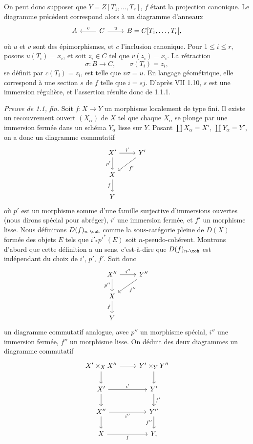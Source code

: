 \documentclass[11pt]{article}
\begin{document}
On peut donc supposer que \(Y=Z[T_1,\ldots,T_r]\), \(f\) étant la projection canonique. Le diagramme précédent correspond alors à un diagramme d'anneaux
\[
\begin{tikzcd}
A & C \arrow[l,"v"'] \arrow[r,"u"] & B=C[T_1,\ldots,T_r],
\end{tikzcd}
\]
où \(u\) et \(v\) sont des épimorphismes, et \(c\) l'inclusion canonique. Pour \(1\leq i\leq r\), posons \(u(T_i)=x_i\), et soit \(z_i\in C\) tel que \(v(z_i)=x_i\). La rétraction
\[
  \sigma:B\longrightarrow C,\qquad \sigma(T_i)=z_i,
\]
se définit par \(c(T_i)=z_i\), est telle que \(v\sigma=u\). En langage géométrique, elle correspond à une section \(s\) de \(f\) telle que \(i=sj\). D'après VII 1.10, \(s\) est une immersion régulière, et l'assertion résulte donc de 1.1.1.

\emph{Preuve de 1.1, fin.} Soit \(f:X\to Y\) un morphisme localement de type fini. Il existe un recouvrement ouvert \((X_\alpha)\) de \(X\) tel que chaque \(X_\alpha\) se plonge par une immersion fermée dans un schéma \(Y_\alpha\) lisse sur \(Y\). Posant \(\coprod X_\alpha=X'\), \(\coprod Y_\alpha=Y'\), on a donc un diagramme commutatif
\[
\begin{tikzcd}
X' \arrow[r,"i'"] \arrow[d,"p'"'] & Y' \arrow[dl,"f'"]\\
X \arrow[d,"f"']\\
Y
\end{tikzcd}
\]
où \(p'\) est un morphisme somme d'une famille surjective d'immersions ouvertes (nous dirons spécial pour abréger), \(i'\) une immersion fermée, et \(f'\) un morphisme lisse. Nous définirons \(D(f)_{n\text{-}\coh}\) comme la sous-catégorie pleine de \(D(X)\) formée des objets \(E\) tels que \(i'_*p'^*(E)\) soit \(n\)-pseudo-cohérent. Montrons d'abord que cette définition a un sens, c'est-à-dire que \(D(f)_{n\text{-}\coh}\) est indépendant du choix de \(i'\), \(p'\), \(f'\). Soit donc
\[
\begin{tikzcd}
X'' \arrow[r,"i''"] \arrow[d,"p''"'] & Y'' \arrow[dl,"f''"]\\
X \arrow[d,"f"']\\
Y
\end{tikzcd}
\]
un diagramme commutatif analogue, avec \(p''\) un morphisme spécial, \(i''\) une immersion fermée, \(f''\) un morphisme lisse. On déduit des deux diagrammes un diagramme commutatif
\[
\begin{tikzcd}
X'\times_X X'' \arrow[r] \arrow[d] & Y'\times_Y Y'' \arrow[d]\\
X' \arrow[r,"i'"] \arrow[d] & Y' \arrow[d,"f'"]\\
X'' \arrow[r,"i''"'] \arrow[d] & Y'' \arrow[d,"f''"']\\
X \arrow[r,"f"'] & Y,
\end{tikzcd}
\]
\end{document}
